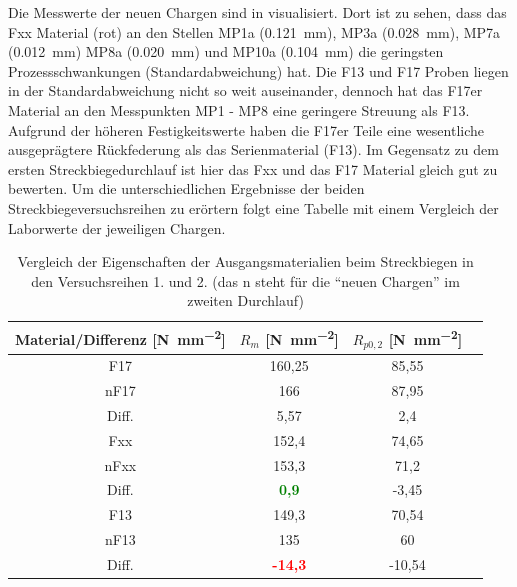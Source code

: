\documentclass[12pt,a4paper,parskip,twoside,BCOR5mm,headsepline]{scrartcl}
\begin{document}
Die Messwerte der neuen Chargen sind in  visualisiert. Dort ist zu sehen, dass das Fxx Material (rot) an den Stellen MP1a (\SI{0,121}{\milli\meter}), MP3a (\SI{0,028}{\milli\metre}),  MP7a (\SI{0,012}{\milli\meter}) MP8a (\SI{0,020}{\milli\meter}) und MP10a (\SI{0,104}{\milli\meter}) die geringsten Prozessschwankungen (Standardabweichung) hat.  Die F13 und F17 Proben liegen in der Standardabweichung nicht so weit auseinander, dennoch hat das F17er Material an den Messpunkten MP1 - MP8 eine geringere Streuung als F13. Aufgrund der höheren Festigkeitswerte haben die F17er Teile eine wesentliche ausgeprägtere Rückfederung als das Serienmaterial (F13). Im Gegensatz zu dem ersten Streckbiegedurchlauf ist hier das Fxx und das F17 Material gleich gut zu bewerten. Um die unterschiedlichen Ergebnisse der beiden Streckbiegeversuchsreihen zu erörtern folgt eine Tabelle mit einem Vergleich der Laborwerte der jeweiligen Chargen. 

\begin{table}[H]
\caption{Vergleich der Eigenschaften der  Ausgangsmaterialien beim Streckbiegen in den Versuchsreihen 1. und 2. (das n steht für die "`neuen Chargen"' im zweiten Durchlauf)}
\label{tab:altneu}
\centering
\begin{tabular}{cccc}
\toprule
Material/Differenz [\si{\newton\per\milli\meter\squared}] & $R_m$ [\si{\newton\per\milli\meter\squared}]& $R_{p0,2}$ [\si{\newton\per\milli\meter\squared}] \\
\midrule
F17 & 160,25 & 85,55 \\
nF17 & 166 & 87,95 \\
Diff. & 5,57 & 2,4 \\
\midrule
Fxx & 152,4 & 74,65 \\
nFxx & 153,3 & 71,2 \\
Diff. & \textbf{\textcolor{green}{0,9}} & -3,45 \\
\midrule
F13 & 149,3 & 70,54 \\
nF13 & 135 & 60 \\
Diff. & \textbf{\textcolor{red}{-14,3}} & -10,54 \\
\bottomrule
\end{tabular}
\end{table}
\end{document}
